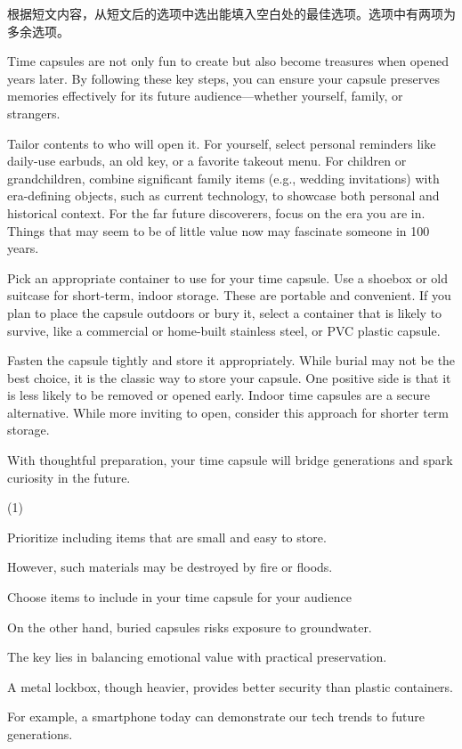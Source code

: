 \documentclass{英语试卷}
\begin{document}
\par 根据短文内容，从短文后的选项中选出能填入空白处的最佳选项。选项中有两项为多余选项。\par
\par Time capsules are not only fun to create but also become treasures when opened years later.  By following these key steps, you can ensure your capsule preserves memories effectively for its future audience—whether yourself, family, or strangers.\par
\par {} Tailor contents to who will open it. For yourself, select personal reminders like daily-use earbuds, an old key, or a favorite takeout menu. For children or grandchildren, combine significant family items (e.g., wedding invitations) with era-defining objects, such as current technology, to showcase both personal and historical context.  For the far future discoverers, focus on the era you are in. Things that may seem to be of little value now may fascinate someone in 100 years.\par
\par Pick an appropriate container to use for your time capsule. Use a shoebox or old suitcase for short-term, indoor storage. These are portable and convenient. \blanknum{} If you plan to place the capsule outdoors or bury it, select a container that is likely to survive, like a commercial or home-built stainless steel, or PVC plastic capsule.\par
\par Fasten the capsule tightly and store it appropriately. While burial may not be the best choice, it is the classic way to store your capsule. One positive side is that it is less likely to be removed or opened early.  Indoor time capsules are a secure alternative. While more inviting to open, consider this approach for shorter term storage.\par
\par With thoughtful preparation, your time capsule will bridge generations and spark curiosity in the future.\par
\begin{choices}(1)
  \item Prioritize including items that are small and easy to store.
  \item However, such materials may be destroyed by fire or floods.
  \item Choose items to include in your time capsule for your audience
  \item On the other hand, buried capsules risks exposure to groundwater.
  \item The key lies in balancing emotional value with practical preservation.
  \item A metal lockbox, though heavier, provides better security than plastic containers.
  \item For example, a smartphone today can demonstrate our tech trends to future generations.
\end{choices}
\end{document}
